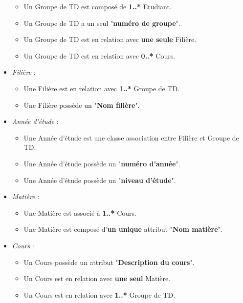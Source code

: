 \documentclass[a4paper, 11pt]{article}
\begin{document}
\begin{itemize}
                \begin{itemize}
                \item Un Groupe de TD est composé de \textbf{1..*} Etudiant.
                \item Un Groupe de TD a un seul "\textbf{numéro de groupe}".
                \item Un Groupe de TD est en relation avec \textbf{une seule} Filière.
                \item Un Groupe de TD est en relation avec \textbf{0..*} Cours.
                \end{itemize}
        \item \textit{Filière} :
                \begin{itemize}
                \item Une Filière est en relation avec \textbf{1..*} Groupe de TD.
                \item Une Filière possède un "\textbf{Nom filière}".
                \end{itemize}
        \item \textit{Année d'étude} :
                \begin{itemize}
                \item Une Année d'étude est une classe association entre Filière et Groupe de TD.
                \item Une Année d'étude possède un "\textbf{numéro d'année}".
                \item Une Année d'étude possède un "\textbf{niveau d'étude}".
                \end{itemize}
        \item \textit{Matière} :
                \begin{itemize}
                \item Une Matière est associé à \textbf{1..*} Cours.
                \item Une Matière est composé d'\textbf{un unique} attribut "\textbf{Nom matière}".
                \end{itemize}
        \item \textit{Cours} :
                \begin{itemize}
                \item Un Cours possède un attribut "\textbf{Description du cours}".
                \item Un Cours est en relation avec \textbf{une seul} Matière.
                \item Un Cours est en relation avec \textbf{1..*} Groupe de TD.

\end{itemize}
\end{itemize}
\end{document}
